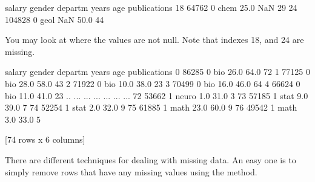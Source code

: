 \documentclass[letterpaper,10pt,english]{sphinxmanual}
\begin{document}
\begin{sphinxVerbatim}[commandchars=\\\{\}]
\PYG{p}{[}\PYG{p}{]}
\end{sphinxVerbatim}

\begin{sphinxVerbatim}[commandchars=\\\{\}]
    salary  gender departm  years   age  publications
18   64762       0    chem   25.0   NaN            29
24  104828       0    geol    NaN  50.0            44
\end{sphinxVerbatim}

You may look at where the values are not null. Note that indexes 18, and 24 are missing.

\begin{sphinxVerbatim}[commandchars=\\\{\}]
\PYG{p}{[}\PYG{p}{]}
\end{sphinxVerbatim}

\begin{sphinxVerbatim}[commandchars=\\\{\}]
    salary  gender departm  years   age  publications
0    86285       0     bio   26.0  64.0            72
1    77125       0     bio   28.0  58.0            43
2    71922       0     bio   10.0  38.0            23
3    70499       0     bio   16.0  46.0            64
4    66624       0     bio   11.0  41.0            23
..     ...     ...     ...    ...   ...           ...
72   53662       1   neuro    1.0  31.0             3
73   57185       1    stat    9.0  39.0             7
74   52254       1    stat    2.0  32.0             9
75   61885       1    math   23.0  60.0             9
76   49542       1    math    3.0  33.0             5

[74 rows x 6 columns]
\end{sphinxVerbatim}

There are different techniques for dealing with missing data.  An easy one is to simply remove rows that have any missing values using the  method.

\begin{sphinxVerbatim}[commandchars=\\\{\}]
\end{sphinxVerbatim}
\end{document}
